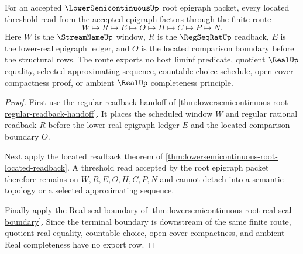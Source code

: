 \begin{theorem}
\label{thm:lowersemicontinuous-root-located-threshold-exhaustion}
For an accepted $\LowerSemicontinuousUp$ root epigraph packet, every located threshold read from the accepted epigraph factors through the finite route
$$
W \longmapsto R \longmapsto E \longmapsto O \longmapsto H \longmapsto C \longmapsto P \longmapsto N .
$$
Here $W$ is the $\StreamNameUp$ window, $R$ is the $\RegSeqRatUp$ readback, $E$ is the lower-real epigraph ledger, and $O$ is the located comparison boundary before the structural rows. The route exports no host liminf predicate, quotient $\RealUp$ equality, selected approximating sequence, countable-choice schedule, open-cover compactness proof, or ambient $\RealUp$ completeness principle.
\end{theorem}
\begin{proof}
First use the regular readback handoff of \autoref{thm:lowersemicontinuous-root-regular-readback-handoff}. It places the scheduled window $W$ and regular rational readback $R$ before the lower-real epigraph ledger $E$ and the located comparison boundary $O$.

Next apply the located readback theorem of \autoref{thm:lowersemicontinuous-root-located-readback}. A threshold read accepted by the root epigraph packet therefore remains on $W,R,E,O,H,C,P,N$ and cannot detach into a semantic topology or a selected approximating sequence.

Finally apply the Real seal boundary of \autoref{thm:lowersemicontinuous-root-real-seal-boundary}. Since the terminal boundary is downstream of the same finite route, quotient real equality, countable choice, open-cover compactness, and ambient Real completeness have no export row.
\end{proof}

